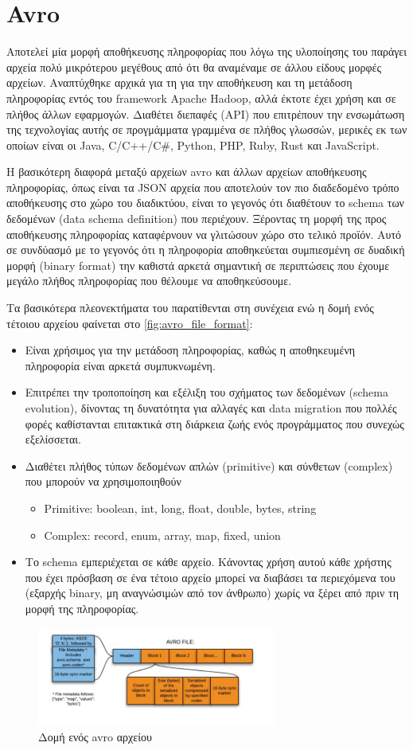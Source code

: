 \section{Avro}
\label{section:avro}

Αποτελεί μία μορφή αποθήκευσης πληροφορίας που λόγω της υλοποίησης του παράγει αρχεία
πολύ μικρότερου μεγέθους από ότι θα αναμέναμε σε άλλου είδους μορφές αρχείων. Αναπτύχθηκε αρχικά για
τη για την αποθήκευση και τη μετάδοση πληροφορίας εντός του framework Apache Hadoop, αλλά έκτοτε
έχει χρήση και σε πλήθος άλλων εφαρμογών. Διαθέτει διεπαφές (API) που επιτρέπουν την ενσωμάτωση της τεχνολογίας αυτής σε
προγμάμματα γραμμένα σε πλήθος γλωσσών, μερικές εκ των οποίων είναι οι Java, C/C++/C\#, Python, PHP, Ruby, Rust και JavaScript.

Η βασικότερη διαφορά μεταξύ αρχείων avro και άλλων αρχείων αποθήκευσης πληροφορίας, όπως είναι τα JSON αρχεία
που αποτελούν τον πιο διαδεδομένο τρόπο αποθήκευσης στο χώρο του διαδικτύου, είναι το γεγονός
ότι διαθέτουν το schema των δεδομένων (data schema definition) που περιέχουν. Ξέροντας τη μορφή της προς αποθήκευσης πληροφορίας
καταφέρνουν να γλιτώσουν χώρο στο τελικό προϊόν. Αυτό σε συνδύασμό με το γεγονός ότι η πληροφορία αποθηκεύεται
συμπιεσμένη σε δυαδική μορφή (binary format) την καθιστά αρκετά σημαντική σε περιπτώσεις που έχουμε μεγάλο πλήθος πληροφορίας
που θέλουμε να αποθηκεύσουμε.

Τα βασικότερα πλεονεκτήματα του παρατίθενται στη συνέχεια ενώ η δομή ενός τέτοιου αρχείου φαίνεται στο \autoref{fig:avro_file_format}:

\begin{itemize}
	\item Είναι χρήσιμος για την μετάδοση πληροφορίας, καθώς η αποθηκευμένη πληροφορία είναι
		αρκετά συμπυκνωμένη.
	\item Επιτρέπει την τροποποίηση και εξέλιξη του σχήματος των δεδομένων (schema evolution), δίνοντας
		τη δυνατότητα για αλλαγές και data migration που πολλές φορές καθίστανται επιτακτικά 
		στη διάρκεια ζωής ενός προγράμματος που συνεχώς εξελίσσεται.
	\item Διαθέτει πλήθος τύπων δεδομένων απλών (primitive) και σύνθετων (complex) που μπορούν να χρησιμοποιηθούν
		\begin{itemize}
			\item Primitive: boolean, int, long, float, double, bytes, string
			\item Complex: record, enum, array, map, fixed, union 
		\end{itemize}
	\item Το schema εμπεριέχεται σε κάθε αρχείο. Κάνοντας χρήση αυτού κάθε χρήστης που έχει
		πρόσβαση σε ένα τέτοιο αρχείο μπορεί να διαβάσει τα περιεχόμενα του (εξαρχής binary, μη αναγνώσιμών από τον άνθρωπο)
		χωρίς να ξέρει από πριν τη μορφή της πληροφορίας. 
\end{itemize}


\begin{figure}[!ht]
	\centering
	\includegraphics[width=0.7\textwidth]{./images/chapter2/avro_file_format.png}
	\caption[Δομή ενός avro αρχείου]{Δομή ενός avro αρχείου}
	\label{fig:avro_file_format}
\end{figure}